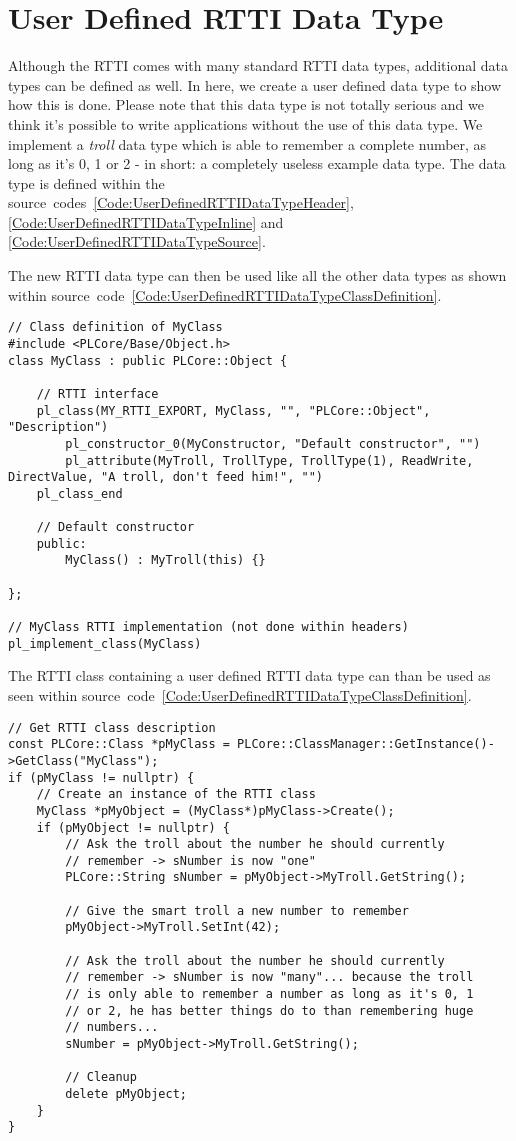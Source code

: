 \chapter{User Defined RTTI Data Type}
\label{Appendix:UserDefinedRTTIDataType}
Although the RTTI comes with many standard RTTI data types, additional data types can be defined as well. In here, we create a user defined data type to show how this is done. Please note that this data type is not totally serious and we think it's possible to write applications without the use of this data type. We implement a \emph{troll} data type which is able to remember a complete number, as long as it's 0, 1 or 2 - in short: a completely useless example data type. The data type is defined within the source~codes~\ref{Code:UserDefinedRTTIDataTypeHeader}, \ref{Code:UserDefinedRTTIDataTypeInline} and \ref{Code:UserDefinedRTTIDataTypeSource}.

The new RTTI data type can then be used like all the other data types as shown within source~code~\ref{Code:UserDefinedRTTIDataTypeClassDefinition}.
\begin{lstlisting}[label=Code:UserDefinedRTTIDataTypeClassDefinition,caption={RTTI class using a user defined RTTI data type}]
// Class definition of MyClass
#include <PLCore/Base/Object.h>
class MyClass : public PLCore::Object {

	// RTTI interface
	pl_class(MY_RTTI_EXPORT, MyClass, "", "PLCore::Object", "Description")
		pl_constructor_0(MyConstructor, "Default constructor", "")
		pl_attribute(MyTroll, TrollType, TrollType(1), ReadWrite, DirectValue, "A troll, don't feed him!", "")
	pl_class_end

	// Default constructor
	public:
		MyClass() : MyTroll(this) {}

};

// MyClass RTTI implementation (not done within headers)
pl_implement_class(MyClass)
\end{lstlisting}
The RTTI class containing a user defined RTTI data type can than be used as seen within source~code~\ref{Code:UserDefinedRTTIDataTypeClassDefinition}.
\begin{lstlisting}[label=Code:UserDefinedRTTIDataTypeClassUsage,caption={Using a RTTI class containing a user defined RTTI data type}]
// Get RTTI class description
const PLCore::Class *pMyClass = PLCore::ClassManager::GetInstance()->GetClass("MyClass");
if (pMyClass != nullptr) {
	// Create an instance of the RTTI class
	MyClass *pMyObject = (MyClass*)pMyClass->Create();
	if (pMyObject != nullptr) {
		// Ask the troll about the number he should currently
		// remember -> sNumber is now "one"
		PLCore::String sNumber = pMyObject->MyTroll.GetString();

		// Give the smart troll a new number to remember
		pMyObject->MyTroll.SetInt(42);

		// Ask the troll about the number he should currently
		// remember -> sNumber is now "many"... because the troll
		// is only able to remember a number as long as it's 0, 1
		// or 2, he has better things do to than remembering huge
		// numbers...
		sNumber = pMyObject->MyTroll.GetString();

		// Cleanup
		delete pMyObject;
	}
}
\end{lstlisting}


